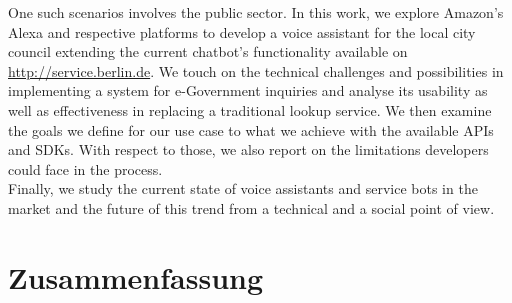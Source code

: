 One such scenarios involves the public sector. In this work, we explore Amazon's Alexa and respective platforms to develop a voice assistant for the local city council extending the current chatbot's functionality available on \href{ https://service.berlin.de/virtueller-assistent/virtueller-assistent-606279.php}{http://service.berlin.de}. We touch on the technical challenges and possibilities in implementing a system for e-Government inquiries and analyse its usability as well as effectiveness in replacing a traditional lookup service. We then examine the goals we define for our use case to what we achieve with the available APIs and SDKs. With respect to those, we also report on the limitations developers could face in the process.\\

Finally, we study the current state of voice assistants and service bots in the market and the future of this trend from a technical and a social point of view.

\newpage
\chapter*{Zusammenfassung}
 \\
\\
\\




